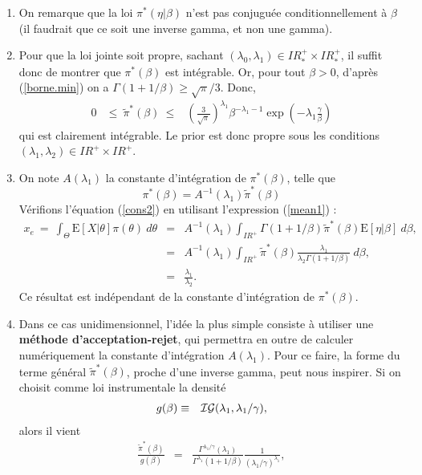 \documentclass[10pt]{article}
\newcommand{\R}{I\!\!R}
\newcommand{\E}{\mbox{E}}
\newcommand{\1}{\mathbbm{1}}
\begin{document}
\begin{enumerate}
\item On remarque que la loi $\pi^*(\eta|\beta)$ n'est pas conjugu\'ee conditionnellement \`a $\beta$ (il faudrait que ce soit une inverse gamma, et non une gamma). 
\item Pour que la loi jointe soit propre, sachant $(\lambda_0,\lambda_1)\in\R^+_*\times \R^+_*$, il suffit donc de montrer que $\pi^*(\beta)$ est int\'egrable. Or, pour tout $\beta>0$, d'apr\`es (\ref{borne.min}) on a $\Gamma(1+1/\beta)\geq \sqrt{\pi}/{3}$. Donc,  
\begin{eqnarray*}
0 & \leq \ \tilde{\pi}^*(\beta) \ \leq & \left(\frac{3}{\sqrt{\pi}}\right)^{\lambda_1} \beta^{-\lambda_1-1} \exp\left(-\lambda_1 \frac{\gamma}{\beta}\right)
\end{eqnarray*}
qui est clairement int\'egrable. Le prior est donc propre sous les conditions $(\lambda_1,\lambda_2)\in\R^+\times \R^+$. 
\item On note $A(\lambda_1)$ la constante d'int\'egration de $\pi^*(\beta)$, telle que
$$
\pi^*(\beta) = A^{-1}(\lambda_1)\tilde{\pi}^*(\beta)
$$
V\'erifions l'\'equation (\ref{cons2}) en utilisant l'expression (\ref{mean1}) : 
\begin{eqnarray*}
x_e \ = \ \int_{\Theta} \E[X|\theta] \pi(\theta)  \ d\theta & = &  A^{-1}(\lambda_1) \int_{\R^+} \Gamma(1+1/\beta) \tilde{\pi}^*(\beta)\E[\eta|\beta] \ d\beta, \\
& = & A^{-1}(\lambda_1) \int_{\R^+}  \tilde{\pi}^*(\beta) \frac{\lambda_1}{\lambda_2 \Gamma(1+1/\beta)} \ d\beta, \\
& = & \frac{\lambda_1}{\lambda_2}.
\end{eqnarray*}
Ce r\'esultat est ind\'ependant de la constante d'int\'egration de $\pi^*(\beta)$.
\item Dans ce cas unidimensionnel, l'id\'ee la plus simple consiste \`a utiliser une {\bf m\'ethode d'acceptation-rejet}, qui permettra en outre de calculer num\'eriquement la constante d'int\'egration  $A(\lambda_1)$. Pour ce faire, la forme du terme g\'en\'eral $\tilde{\pi}^*(\beta)$, proche d'une inverse gamma, peut nous inspirer. Si on choisit comme loi instrumentale la densit\'e
\begin{eqnarray*}
g(\beta) & \equiv & {\cal{IG}}(\lambda_1,\lambda_1/\gamma),
\end{eqnarray*}
alors il vient
\begin{eqnarray*}
\frac{\tilde{\pi}^*(\beta)}{g(\beta)} & = & \frac{\Gamma^{\lambda_1/\gamma}(\lambda_1)}{\Gamma^{\lambda_1}(1+1/\beta)}\frac{1}{\left(\lambda_1/\gamma\right)^{\lambda_1}}, \\

\end{eqnarray*}
\end{enumerate}
\end{document}
